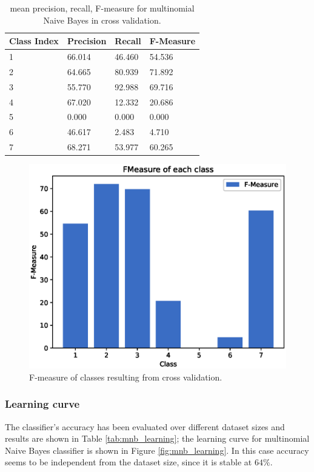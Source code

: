 \documentclass[a4paper, 10pt]{article}
\begin{document}
\begin{table}[H]
\centering
\begin{tabular}{|l|l|l|l|}
\hline
\textbf{Class Index} & \textbf{Precision} & \textbf{Recall} & \textbf{F-Measure}\\\hline
1 & 66.014 & 46.460& 54.536\\\hline
2 & 64.665 & 80.939& 71.892\\\hline
3 & 55.770 & 92.988& 69.716\\\hline
4 & 67.020 & 12.332& 20.686\\\hline
5 & 0.000 & 0.000& 0.000\\\hline
6 & 46.617 & 2.483& 4.710\\\hline
7 & 68.271 & 53.977& 60.265\\\hline
\end{tabular}
\caption{mean precision, recall, F-measure for multinomial Naive Bayes in cross validation.}
\label{tab:mnb_cross_pr}
\end{table}
\begin{figure}[H]
 \centering
 \includegraphics[width=0.8\linewidth]{pictures/nb_multi_fmeasure.eps}
 \caption{F-measure of classes resulting from cross validation.}
 \label{fig:mnb_fmeasure}
\end{figure}


\subsubsection{Learning curve}
The classifier's accuracy has been evaluated over different dataset sizes and results are shown in Table \ref{tab:mnb_learning}; the learning curve for multinomial Naive Bayes classifier is shown in Figure \ref{fig:mnb_learning}. In this case accuracy seems to be independent from the dataset size, since it is stable at $64\%$.
\end{document}
